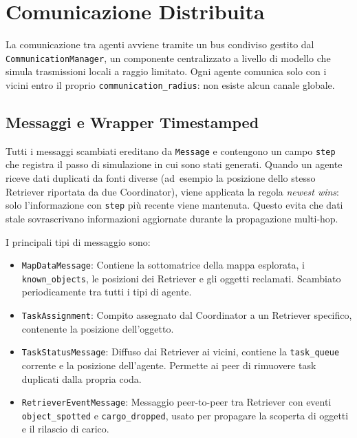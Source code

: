 \chapter{Comunicazione Distribuita}

La comunicazione tra agenti avviene tramite un bus condiviso gestito dal
\texttt{CommunicationManager}, un componente centralizzato a livello di modello
che simula trasmissioni locali a raggio limitato. Ogni agente comunica solo con
i vicini entro il proprio \texttt{communication\_radius}: non esiste alcun canale
globale.

\section{Messaggi e Wrapper Timestamped}

Tutti i messaggi scambiati ereditano da \texttt{Message} e contengono un campo
\texttt{step} che registra il passo di simulazione in cui sono stati generati.
Quando un agente riceve dati duplicati da fonti diverse (ad~esempio la posizione
dello stesso Retriever riportata da due Coordinator), viene applicata la regola
\textit{newest wins}: solo l'informazione con \texttt{step} pi\`u recente viene
mantenuta. Questo evita che dati stale sovrascrivano informazioni aggiornate
durante la propagazione multi-hop.

I principali tipi di messaggio sono:

\begin{itemize}
    \item \texttt{MapDataMessage}: Contiene la sottomatrice della mappa esplorata,
          i \texttt{known\_objects}, le posizioni dei Retriever e gli oggetti reclamati.
          Scambiato periodicamente tra tutti i tipi di agente.
    \item \texttt{TaskAssignment}: Compito assegnato dal Coordinator a un Retriever
          specifico, contenente la posizione dell'oggetto.
    \item \texttt{TaskStatusMessage}: Diffuso dai Retriever ai vicini, contiene la
          \texttt{task\_queue} corrente e la posizione dell'agente. Permette ai peer
          di rimuovere task duplicati dalla propria coda.
    \item \texttt{RetrieverEventMessage}: Messaggio peer-to-peer tra Retriever con
          eventi \texttt{object\_spotted} e \texttt{cargo\_dropped}, usato per
          propagare la scoperta di oggetti e il rilascio di carico.
\end{itemize}

